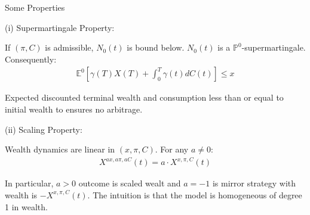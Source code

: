 \documentclass{beamer}
\begin{document}
\begin{frame}{Some Properties}

    {\footnotesize \footnotesize
    \par (i) Supermartingale Property:
    \vspace{1em}
    \par If $(\pi,C)$ is admissible, $N_0(t)$ is bound below.  $N_0(t)$ is a $\mathbb{P}^0$-supermartingale. Consequently:
    \begin{align*}
          \mathbb{E}^0 \left[ \gamma(T)X(T) + \int_0^T \gamma(t)dC(t) \right] \leq x
    \end{align*}
    \par  Expected discounted terminal wealth and consumption less than or equal to initial wealth to ensures no arbitrage.
    \vspace{1em}
    \par (ii) Scaling Property:
    \vspace{1em}
    \par Wealth dynamics are linear in $(x, \pi, C)$. For any $a \neq 0$:
    \begin{align*}
         X^{ax, a\pi, aC}(t) = a \cdot X^{x, \pi, C}(t)
    \end{align*}
    \par In particular,  $a > 0$ outcome is scaled wealt and $a = -1$ is mirror strategy with wealth is $-X^{x, \pi, C}(t)$. 
    The intuition is that the model is homogeneous of degree 1 in wealth.
    }
\end{frame} 
\end{document}
